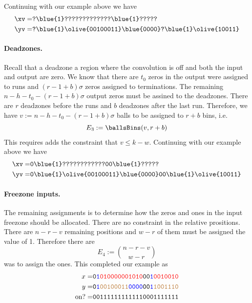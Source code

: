 Continuing with our example above we have
\begin{align*}
    \xv=&\texttt{?\blue{1}?????????????\blue{1}?????}\\
    \yv=&\texttt{?\blue{1}\olive{00100011}\blue{0000}?\blue{1}\olive{10011}}
\end{align*}

\paragraph{Deadzones.} Recall that a deadzone a region where the convolution is off and both the input and output are zero. We know that there are $t_0$ zeros in the output were assigned to runs and $(r-1+b)\sigma$ zeros assigned to terminations. The remaining $n-h-t_0-(r-1+b)\sigma$ output zeros must be assined to the deadzones. There are $r$ deadzones before the runs and $b$ deadzones after the last run. Therefore, we have
$v:=n-h-t_0-(r-1+b)\sigma$ balls to be assigned to $r+b$ bins, i.e.
$$
E_3:= \ballsBins(v,r+b)
$$
This requires adds the constraint that $v\leq k-w$.
Continuing with our example above we have
\begin{align*}
    \xv=&\texttt{0\blue{1}????????????00\blue{1}?????}\\
    \yv=&\texttt{0\blue{1}\olive{00100011}\blue{0000}00\blue{1}\olive{10011}}
\end{align*}


\paragraph{Freezone inputs.} The remaining assignments is to determine how the zeros and ones in the input freezone should be allocated. There are no constraint in the relative prositions. There are $n-r-v$ remaining positions and $w-r$ of them must be assigned the value of 1. Therefore there are
$$
E_4:=\binom{n-r-v}{w-r}
$$
was to assign the ones. This completed our example as
\begin{align*}
    x= & \texttt{0\textcolor{blue}{1}\textcolor{red}{010000001010}00\textcolor{blue}{1}\textcolor{red}{0010010}}\\
    y= & \texttt{0\textcolor{blue}{1}\textcolor{brown}{00100011}\textcolor{blue}{0000}00\textcolor{blue}{1}\textcolor{brown}{1001110}}\\
    \text{on?}= & \texttt{001111111111110001111111}
\end{align*}

